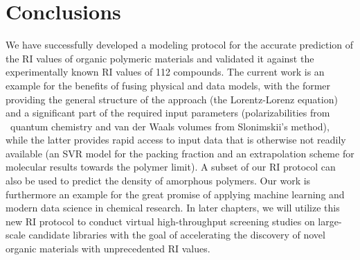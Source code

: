 \section{Conclusions}
\label{sec:conclusions} 
We have successfully developed a modeling protocol for the accurate prediction of the RI values of organic polymeric materials and validated it against the experimentally known RI values of 112 compounds. The current work is an example for the benefits of fusing physical and data models, with the former providing the general structure of the approach (\ie  the Lorentz-Lorenz equation) and a significant part of the required input parameters (\ie  polarizabilities from \firstprinciples\ quantum chemistry and van der Waals volumes from Slonimskii's method), while the latter provides rapid access to input data that is otherwise not readily available (\ie an SVR model for the packing fraction and an extrapolation scheme for molecular results towards the polymer limit). A subset of our RI protocol can also be used to predict the density of amorphous polymers. Our work is furthermore an example for the great promise of applying machine learning and modern data science in chemical research. In later chapters, we will utilize this new RI protocol to conduct virtual high-throughput screening studies on large-scale candidate libraries with the goal of accelerating the discovery of novel organic materials with unprecedented RI values.
